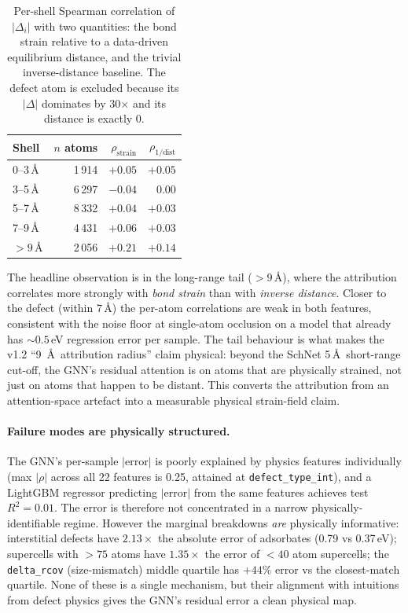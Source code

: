 \documentclass[11pt,a4paper]{article}
\begin{document}
\begin{table}[h]
\centering
\caption{Per-shell Spearman correlation of $|\Delta_i|$ with two
quantities: the bond strain relative to a data-driven equilibrium
distance, and the trivial inverse-distance baseline. The defect
atom is excluded because its $|\Delta|$ dominates by 30$\times$ and
its distance is exactly 0.}
\label{tab:per_shell}
\begin{tabular}{lrrr}
\toprule
Shell & $n$ atoms & $\rho_{\mathrm{strain}}$ & $\rho_{1/\mathrm{dist}}$ \\
\midrule
0--3\,\AA  & 1\,914 & $+0.05$ & $+0.05$ \\
3--5\,\AA  & 6\,297 & $-0.04$ & $\,\,\,0.00$ \\
5--7\,\AA  & 8\,332 & $+0.04$ & $+0.03$ \\
7--9\,\AA  & 4\,431 & $+0.06$ & $+0.03$ \\
$>9$\,\AA  & 2\,056 & $\mathbf{+0.21}$ & $+0.14$ \\
\bottomrule
\end{tabular}
\end{table}

The headline observation is in the long-range tail
($> 9$\,\AA), where the attribution correlates more strongly with
\emph{bond strain} than with \emph{inverse distance}. Closer to the
defect (within 7\,\AA) the per-atom correlations are weak in both
features, consistent with the noise floor at single-atom occlusion
on a model that already has $\sim 0.5$\,eV regression error per
sample. The tail behaviour is what makes the v1.2 ``9~\AA\
attribution radius'' claim physical: beyond the SchNet 5\,\AA\
short-range cut-off, the GNN's residual attention is on atoms that
are physically strained, not just on atoms that happen to be
distant. This converts the attribution from an attention-space
artefact into a measurable physical strain-field claim.

\paragraph{Failure modes are physically structured.}
The GNN's per-sample $|$error$|$ is poorly explained by physics
features individually (max $|\rho|$ across all 22 features is
0.25, attained at \texttt{defect\_type\_int}), and a LightGBM
regressor predicting $|$error$|$ from the same features achieves
test $R^2 = 0.01$. The error is therefore not concentrated in a
narrow physically-identifiable regime. However the marginal
breakdowns \emph{are} physically informative: interstitial defects
have $2.13\times$ the absolute error of adsorbates
(0.79 vs 0.37\,eV); supercells with $> 75$ atoms have
$1.35\times$ the error of $< 40$ atom supercells; the
\texttt{delta\_rcov} (size-mismatch) middle quartile has $+44\%$
error vs the closest-match quartile. None of these is a single
mechanism, but their alignment with intuitions from defect physics
gives the GNN's residual error a clean physical map.
\end{document}
